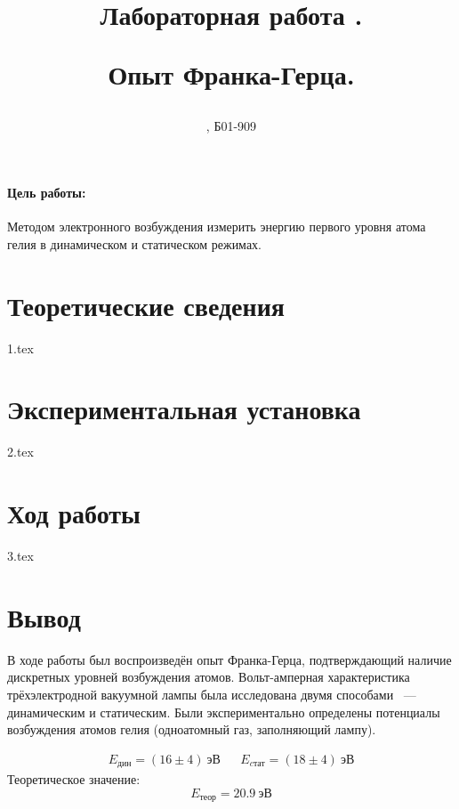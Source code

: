 \documentclass[a5paper, 9pt, twoside]{article} %
\title
{\hfill \break  \hfill \break
\hfill \break  \hfill \break
Лабораторная работа \LNUM.

Опыт Франка-Герца.
}
\author{\SMB, Б01-909}
\begin{document}
\maketitle



\thispagestyle{empty} %

\newpage

\tableofcontents %
\thispagestyle{plain}
\newpage


\paragraph{Цель работы:}
Методом электронного возбуждения измерить энергию первого уровня атома гелия в динамическом и статическом режимах.

\section{Теоретические сведения}
{1.tex}

\newpage
\section{Экспериментальная установка}
{2.tex}

\newpage
\section{Ход работы}
{3.tex}

\newpage
\section{Вывод}

В ходе работы был воспроизведён опыт Франка-Герца, подтверждающий наличие
дискретных уровней возбуждения атомов. Вольт-амперная характеристика
трёхэлектродной вакуумной лампы была исследована двумя способами ~---~ динамическим и
статическим. Были экспериментально определены потенциалы возбуждения
атомов гелия (одноатомный газ, заполняющий лампу).

\begin{align*}
  E_{дин} = (16 \pm 4) \: \text{эВ} &&
  E_{cтат} = (18 \pm 4) \: \text{эВ}
\end{align*}
Теоретическое значение:
$$
E_{теор} = 20.9 \: \text{эВ}
$$
\end{document}

